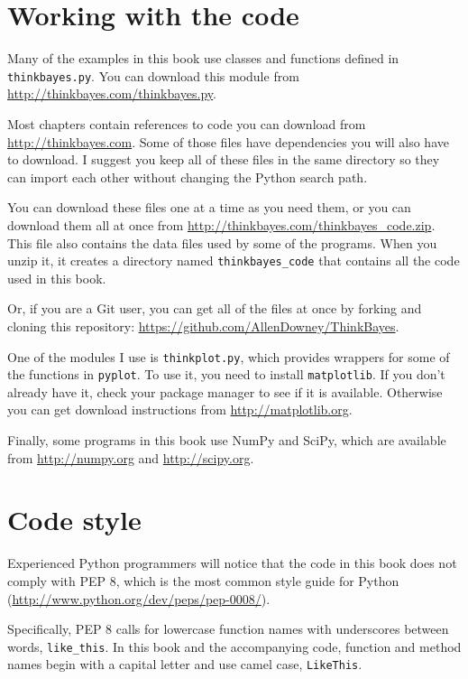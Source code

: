 \documentclass[12pt]{book}
\begin{document}
\section{Working with the code}
\label{download}

Many of the examples in this book use classes and functions
defined in {\tt thinkbayes.py}.  You can download this module
from \url{http://thinkbayes.com/thinkbayes.py}.

Most chapters contain references to code you can download from
\url{http://thinkbayes.com}.  Some of those files have
dependencies you will also have to download.  I suggest you
keep all of these files in the same directory so they can import
each other without changing the Python search path.

You can download these files one at a time as you need them, or you
can download them all at once from
\url{http://thinkbayes.com/thinkbayes_code.zip}.  This file also
contains the data files used by some of the programs.  When you unzip
it, it creates a directory named \verb"thinkbayes_code" that contains
all the code used in this book.

Or, if you are a Git user, you can get all of the files at once by
forking and cloning this repository:
\url{https://github.com/AllenDowney/ThinkBayes}.

One of the modules I use is {\tt thinkplot.py}, which provides
wrappers for some of the functions in {\tt pyplot}.  To use it, you
need to install {\tt matplotlib}.  If you don't already have it, check
your package manager to see if it is available.  Otherwise you can get
download instructions from \url{http://matplotlib.org}.

Finally, some programs in this book use NumPy and SciPy, which are
available from \url{http://numpy.org} and \url{http://scipy.org}.


\section{Code style}

Experienced Python programmers will notice that the code in this
book does not comply with PEP 8, which is the most common
style guide for Python (\url{http://www.python.org/dev/peps/pep-0008/}).

Specifically, PEP 8 calls for lowercase function names with
underscores between words, \verb"like_this".  In this book and
the accompanying code, function and method names begin with
a capital letter and use camel case, \verb"LikeThis".
\end{document}
